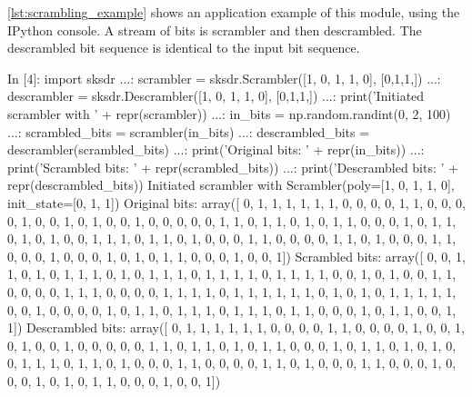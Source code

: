 \autoref{lst:scrambling_example} shows an application example of this module, using the IPython console. A stream of bits is scrambler and then descrambled. The descrambled bit sequence is identical to the input bit sequence.
\begin{python}[label={lst:scrambling_example},caption={Scrambling and Descrambling example}]
  In [4]: import sksdr
  ...: scrambler = sksdr.Scrambler([1, 0, 1, 1, 0], [0,1,1,])
  ...: descrambler = sksdr.Descrambler([1, 0, 1, 1, 0], [0,1,1,])
  ...: print('Initiated scrambler with ' + repr(scrambler))
  ...: in_bits = np.random.randint(0, 2, 100)
  ...: scrambled_bits = scrambler(in_bits)
  ...: descrambled_bits = descrambler(scrambled_bits)
  ...: print('Original bits: ' + repr(in_bits))
  ...: print('Scrambled bits: ' + repr(scrambled_bits))
  ...: print('Descrambled bits: ' + repr(descrambled_bits))
Initiated scrambler with Scrambler(poly=[1, 0, 1, 1, 0], init_state=[0, 1, 1])
Original bits: array([
      0, 1, 1, 1, 1, 1, 1, 0, 0, 0, 0, 1, 1, 0, 0, 0, 0, 1, 0, 0, 1, 0,
      1, 0, 0, 1, 0, 0, 0, 0, 0, 1, 1, 0, 1, 1, 0, 1, 0, 1, 1, 0, 0, 0,
      1, 0, 1, 1, 0, 1, 0, 1, 0, 0, 1, 1, 1, 0, 1, 1, 0, 1, 0, 0, 0, 1,
      1, 0, 0, 0, 0, 1, 1, 0, 1, 0, 0, 0, 1, 1, 0, 0, 0, 1, 0, 0, 0, 1,
      0, 1, 0, 1, 1, 0, 0, 0, 1, 0, 0, 1])
Scrambled bits: array([
      0, 0, 1, 1, 0, 1, 0, 1, 1, 1, 0, 1, 0, 1, 1, 1, 0, 1, 1, 1, 1, 0,
      1, 1, 1, 1, 0, 0, 1, 0, 1, 0, 0, 1, 1, 0, 0, 0, 0, 1, 1, 1, 0, 0,
      0, 0, 1, 1, 1, 1, 0, 1, 1, 1, 1, 1, 1, 0, 1, 0, 1, 0, 1, 1, 1, 1,
      1, 0, 0, 1, 0, 0, 0, 0, 1, 0, 1, 1, 0, 1, 1, 1, 0, 1, 1, 1, 0, 1,
      1, 0, 0, 0, 1, 0, 1, 1, 0, 0, 1, 1])
Descrambled bits: array([
      0, 1, 1, 1, 1, 1, 1, 0, 0, 0, 0, 1, 1, 0, 0, 0, 0, 1, 0, 0, 1, 0,
      1, 0, 0, 1, 0, 0, 0, 0, 0, 1, 1, 0, 1, 1, 0, 1, 0, 1, 1, 0, 0, 0,
      1, 0, 1, 1, 0, 1, 0, 1, 0, 0, 1, 1, 1, 0, 1, 1, 0, 1, 0, 0, 0, 1,
      1, 0, 0, 0, 0, 1, 1, 0, 1, 0, 0, 0, 1, 1, 0, 0, 0, 1, 0, 0, 0, 1,
      0, 1, 0, 1, 1, 0, 0, 0, 1, 0, 0, 1])
\end{python}

